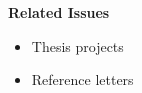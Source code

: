 \begin{frame}
	\textbf{Related Issues}\vspace{0.3cm}

	\begin{itemize}\setlength\itemsep{1em}
	\item Thesis projects
	\item Reference letters
	\end{itemize}
\end{frame}
